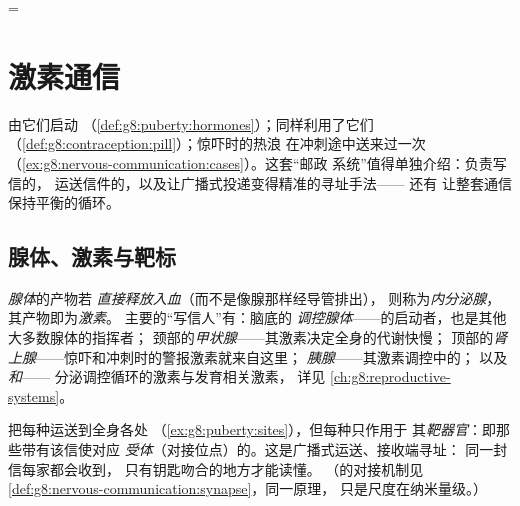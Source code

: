 =\chapter{激素通信}\label{ch:g8:hormonal-communication}

由它们启动
（\cref{def:g8:puberty:hormones}）；同样利用了它们
（\cref{def:g8:contraception:pill}）；惊吓时的热浪
在冲刺途中送来过一次
（\cref{ex:g8:nervous-communication:cases}）。这套“邮政
系统”值得单独介绍：负责写信的，
运送信件的，以及让广播式投递变得精准的寻址手法——
还有
让整套通信保持平衡的循环。

\section{腺体、激素与靶标}

\begin{definition}[内分泌腺]\label{def:g8:hormonal-communication:glands}
\emph{腺体}的产物若
\emph{直接释放入血}（而不是像腺那样经导管排出），
则称为\emph{内分泌腺}，其产物即为\emph{激素}。
主要的“写信人”有：脑底的
\emph{调控腺体}——的启动者，也是其他大多数腺体的指挥者；
颈部的\emph{甲状腺}——其激素决定全身的代谢快慢；
顶部的\emph{肾上腺}——惊吓和冲刺时的警报激素就来自这里；
\emph{胰腺}——其激素调控中的；
以及
\emph{和}——
分泌调控循环的激素与发育相关激素，
详见
\cref{ch:g8:reproductive-systems}。
\end{definition}

\begin{proposition}[由受体寻址]\label{prop:g8:hormonal-communication:address}
把每种运送到全身各处
（\cref{ex:g8:puberty:sites}），但每种只作用于
其\emph{靶器官}：即那些带有该信使对应
\emph{受体}（对接位点）的。这是广播式运送、接收端寻址：
同一封信每家都会收到，
只有钥匙吻合的地方才能读懂。
（的对接机制见
\cref{def:g8:nervous-communication:synapse}，同一原理，
只是尺度在纳米量级。）
\end{proposition}
\admitted

